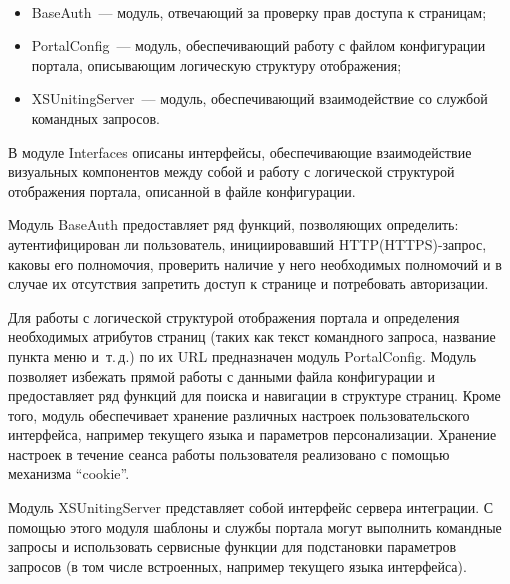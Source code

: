  \begin{figure} %
\vspace*{1pt}
\begin{center}
\mbox{%
\epsfxsize=127.994mm
}
\end{center}
 \end{figure}

\begin{multicols}{2}

\noindent
\begin{itemize}
\item BaseAuth~--- модуль, отвечающий за проверку прав доступа к страницам;
\item PortalConfig~--- модуль, обеспечивающий работу с файлом
конфигурации портала, опи\-сы\-ва\-ющим логическую структуру отображения;
\item XSUnitingServer~--- модуль, обеспечивающий взаимодействие со службой
командных запросов.
\end{itemize}

 В модуле Interfaces описаны интерфейсы, обеспечивающие взаимодействие
визуальных компонентов между собой и работу с логической структурой отображения
портала, описанной в файле конфигурации.

 Модуль BaseAuth предоставляет ряд функций, позволяющих определить:
аутентифицирован ли пользователь, инициировавший HTTP(HTTPS)-запрос, каковы его
полномочия, проверить наличие у него необходимых полномочий и в случае их
отсутствия запретить доступ к странице и потребовать авторизации.

 Для работы с логической структурой отображения портала и определения
необходимых атрибутов страниц (таких как текст командного запроса, название пункта
меню и~т.\,д.) по их URL предназначен модуль PortalConfig. Модуль позволяет избежать
прямой работы с данными файла конфигурации и предоставляет ряд функций для поиска
и навигации в структуре страниц. Кроме того, модуль обеспечивает хранение различных
настроек пользовательского интерфейса, например текущего языка и параметров
персонализации. Хранение настроек в течение сеанса работы пользователя реализовано с
помощью механизма ``cookie''.

 Модуль XSUnitingServer представляет собой интерфейс сервера интеграции. С
помощью этого модуля шаблоны и службы портала могут выполнить командные запросы
и использовать сервисные функции для подстановки параметров запросов (в том числе
встроенных, например текущего языка интерфейса).


\end{multicols}
